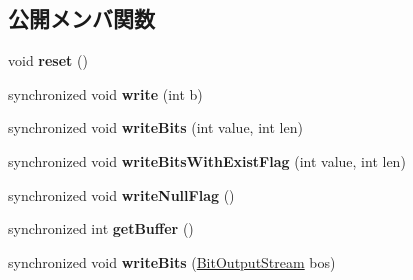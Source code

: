 \subsection*{公開メンバ関数}
\begin{DoxyCompactItemize}
\item 
\hypertarget{classadf_1_1component_1_1communication_1_1util_1_1BitOutputStream_a931675a38ac9a042b61ad897c38ca2b1}{}\label{classadf_1_1component_1_1communication_1_1util_1_1BitOutputStream_a931675a38ac9a042b61ad897c38ca2b1} 
void {\bfseries reset} ()
\item 
\hypertarget{classadf_1_1component_1_1communication_1_1util_1_1BitOutputStream_acce75a559c869b003d1166858802d886}{}\label{classadf_1_1component_1_1communication_1_1util_1_1BitOutputStream_acce75a559c869b003d1166858802d886} 
synchronized void {\bfseries write} (int b)
\item 
\hypertarget{classadf_1_1component_1_1communication_1_1util_1_1BitOutputStream_aba842df4db5c7632cf4c884490aa451e}{}\label{classadf_1_1component_1_1communication_1_1util_1_1BitOutputStream_aba842df4db5c7632cf4c884490aa451e} 
synchronized void {\bfseries write\+Bits} (int value, int len)
\item 
\hypertarget{classadf_1_1component_1_1communication_1_1util_1_1BitOutputStream_a1b83277427bfd0477be1801d556a50ea}{}\label{classadf_1_1component_1_1communication_1_1util_1_1BitOutputStream_a1b83277427bfd0477be1801d556a50ea} 
synchronized void {\bfseries write\+Bits\+With\+Exist\+Flag} (int value, int len)
\item 
\hypertarget{classadf_1_1component_1_1communication_1_1util_1_1BitOutputStream_a8bc9b9b362cbd3526ddf04350d494ef4}{}\label{classadf_1_1component_1_1communication_1_1util_1_1BitOutputStream_a8bc9b9b362cbd3526ddf04350d494ef4} 
synchronized void {\bfseries write\+Null\+Flag} ()
\item 
\hypertarget{classadf_1_1component_1_1communication_1_1util_1_1BitOutputStream_a559168569088c244f06480df77c73b63}{}\label{classadf_1_1component_1_1communication_1_1util_1_1BitOutputStream_a559168569088c244f06480df77c73b63} 
synchronized int {\bfseries get\+Buffer} ()
\item 
\hypertarget{classadf_1_1component_1_1communication_1_1util_1_1BitOutputStream_a1940a7643ab8a3f85af54f29b2294421}{}\label{classadf_1_1component_1_1communication_1_1util_1_1BitOutputStream_a1940a7643ab8a3f85af54f29b2294421} 
synchronized void {\bfseries write\+Bits} (\hyperlink{classadf_1_1component_1_1communication_1_1util_1_1BitOutputStream}{Bit\+Output\+Stream} bos)

\end{DoxyCompactItemize}
